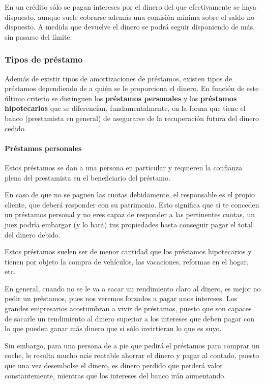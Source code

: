 \documentclass[nochap,palatino,shortheader]{apuntes}
\newcommand{\study}[1]{#1} \newcommand{\substudy}[1]{#1}
\begin{document}
En un \substudy{crédito sólo se pagan intereses por el dinero del que efectivamente se haya dispuesto}, aunque suele cobrarse además una comisión mínima sobre el saldo no dispuesto.
\substudy{A medida que devuelve el dinero se podrá seguir disponiendo de más}, sin pasarse del límite.

\subsubsection{Tipos de préstamo}
Además de existir tipos de amortizaciones de préstamos, existen tipos de préstamos dependiendo de a quién se le proporciona el dinero.
En función de este último criterio se distinguen los \textbf{préstamos personales} y los \textbf{préstamos hipotecarios} que se diferencian, fundamentalmente, en la forma que tiene el banco (prestamista en general) de asegurarse de la recuperación futura del dinero cedido.

\paragraph{Préstamos personales\\}
Estos préstamos \substudy{se dan a una persona en particular} y \study{requieren} la \study{confianza plena} del prestamista en el beneficiario del préstamo.

En caso de que no se paguen las cuotas debidamente, el responsable es el propio cliente, que deberá \study{responder con su patrimonio}.
Esto significa que si te conceden un préstamos personal y no eres capaz de responder a las pertinentes cuotas, un juez podría embargar (y lo hará) tus propiedades hasta conseguir pagar el total del dinero debido.

Estos préstamos suelen ser de menor cantidad que los préstamos hipotecarios y tienen por objeto la compra de vehículos, las vacaciones, reformas en el hogar, etc.

En general, cuando no se le va a sacar un rendimiento claro al dinero, es mejor no pedir un préstamos, pues nos veremos forzados a pagar unos intereses. Los grandes empresarios acostumbran a vivir de préstamos, puesto que son capaces de sacarle un rendimiento al dinero superior a los intereses que deben pagar con lo que pueden ganar más dinero que si sólo invirtieran lo que es suyo.

Sin embargo, para una persona de a pie que pedirá el préstamos para comprar un coche, le resulta mucho más rentable ahorrar el dinero y pagar al contado, puesto que una vez desembolse el dinero, es dinero perdido que perderá valor constantemente, mientras que los intereses del banco irán aumentando.
\end{document}
